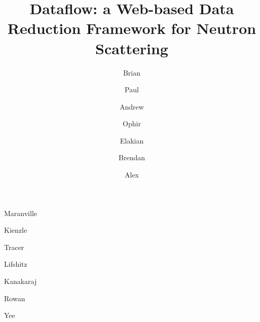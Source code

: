 \documentclass[pdf]{iucr}           %
\begin{document}



\title{Dataflow: a Web-based Data Reduction Framework for Neutron Scattering}


\author[a]{Brian}{Maranville}
\author[a]{Paul}{Kienzle}
\author[a,b]{Andrew}{Tracer}
\author[a]{Ophir}{Lifshitz}
\author[a]{Elakian}{Kanakaraj}
\author[a]{Brendan}{Rowan}
\author[a]{Alex}{Yee}








\end{document}
